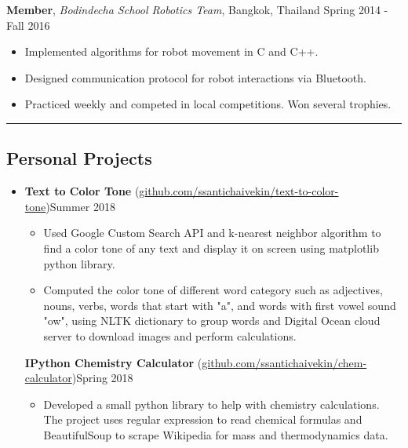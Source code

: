 \documentclass[10.5pt,letterpaper]{article}
\begin{document}
\begin{itemize}
    {\textbf{Member}, \textit{Bodindecha School Robotics Team}, Bangkok, Thailand \hfill {Spring 2014 - Fall 2016}}
     
    \begin{itemize}[label=\textbullet]
      \itemsep0.1em
      \item Implemented algorithms for robot movement in C and C++.
      \item Designed communication protocol for robot interactions via Bluetooth.
      \item Practiced weekly and competed in local competitions. Won several trophies.
      
    \end{itemize}


  \end{itemize}
  
\hrule
\vspace{-1.0em}
\subsection*{Personal Projects}
  \begin{itemize}
    \parskip=-0.2em
    \item[]
    {\textbf{Text to Color Tone} (\href{https://github.com/ssantichaivekin/text-to-color-tone}
    {github.com/ssantichaivekin/text-to-color-tone})\hfill {Summer 2018}}
    \begin{itemize}[label=\textbullet]
        \item  Used Google Custom Search API and k-nearest neighbor algorithm to find a color tone 
        of any text and display it on screen using matplotlib python library.
        \item  Computed the color tone of different word category such as adjectives, nouns, verbs, 
        words that start with "a", and words with first vowel sound "ow", using NLTK dictionary to 
        group words and Digital Ocean cloud server to download images and perform calculations.
    \end{itemize}
    {\textbf{IPython Chemistry Calculator} (\href{https://github.com/ssantichaivekin/chem-calculator}
    {github.com/ssantichaivekin/chem-calculator})\hfill {Spring 2018}}
    \begin{itemize}[label=\textbullet]
        \item  Developed a small python library to help with chemistry calculations. 
        The project uses regular expression to read chemical formulas and BeautifulSoup to scrape 
        Wikipedia for mass and thermodynamics data.
    \end{itemize}
  \end{itemize}
\end{document}
